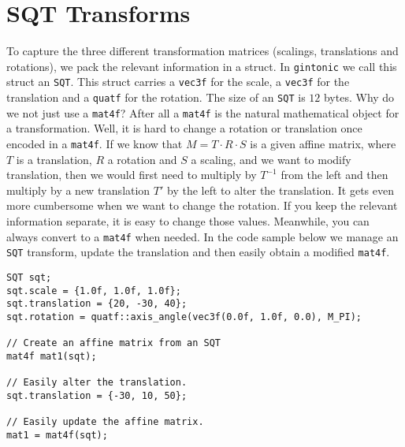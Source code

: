 \documentclass{article}
\begin{document}
\section{SQT Transforms}
To capture the three different transformation matrices (scalings, translations and rotations), we pack the relevant information in a struct. In \texttt{gintonic} we call this struct an \texttt{SQT}. This struct carries a \texttt{vec3f} for the scale, a \texttt{vec3f} for the translation and a \texttt{quatf} for the rotation. The size of an \texttt{SQT} is $12$ bytes. Why do we not just use a \texttt{mat4f}? After all a \texttt{mat4f} is the natural mathematical object for a transformation. Well, it is hard to change a rotation or translation once encoded in a \texttt{mat4f}. If we know that $M = T \cdot R \cdot S$ is a given affine matrix, where $T$ is a translation, $R$ a rotation and $S$ a scaling, and we want to modify translation, then we would first need to multiply by $T^{-1}$ from the left and then multiply by a new translation $T'$ by the left to alter the translation. It gets even more cumbersome when we want to change the rotation. If you keep the relevant information separate, it is easy to change those values. Meanwhile, you can always convert to a \texttt{mat4f} when needed. In the code sample below we manage an \texttt{SQT} transform, update the translation and then easily obtain a modified \texttt{mat4f}.
\begin{lstlisting}
SQT sqt;
sqt.scale = {1.0f, 1.0f, 1.0f};
sqt.translation = {20, -30, 40};
sqt.rotation = quatf::axis_angle(vec3f(0.0f, 1.0f, 0.0), M_PI);

// Create an affine matrix from an SQT
mat4f mat1(sqt);

// Easily alter the translation.
sqt.translation = {-30, 10, 50};

// Easily update the affine matrix.
mat1 = mat4f(sqt);
\end{lstlisting}
\end{document}

